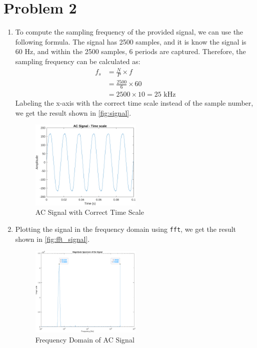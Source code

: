 \documentclass{article}
\begin{document}
\section{Problem 2}
\begin{enumerate}[label=\alph*.]
    \item To compute the sampling frequency of the provided signal, we can use the following formula. The signal has 2500 samples, and it is know the signal is 60 Hz, and within the 2500 samples, 6 periods are captured. Therefore, the sampling frequency can be calculated as:
    \begin{align*}
        f_s &= \frac{N}{P} \times f \\
        &= \frac{2500}{6} \times 60 \\
        &= 2500 \times 10 = 25 \text{ kHz}
    \end{align*}
    Labeling the x-axis with the correct time scale instead of the sample number, we get the result shown in \autoref{fig:signal}.
    \begin{figure}[ht!]
        \centering
        \includegraphics[width=0.5\textwidth]{signal.png}
        \caption{AC Signal with Correct Time Scale}
        \label{fig:signal}
    \end{figure}

    \item Plotting the signal in the frequency domain using \texttt{fft}, we get the result shown in \autoref{fig:fft_signal}.

    \begin{figure}[ht!]
        \centering
        \includegraphics[width=0.5\textwidth]{fft.png}
        \caption{Frequency Domain of AC Signal}
        \label{fig:fft_signal}
    \end{figure}


\end{enumerate}
\end{document}
